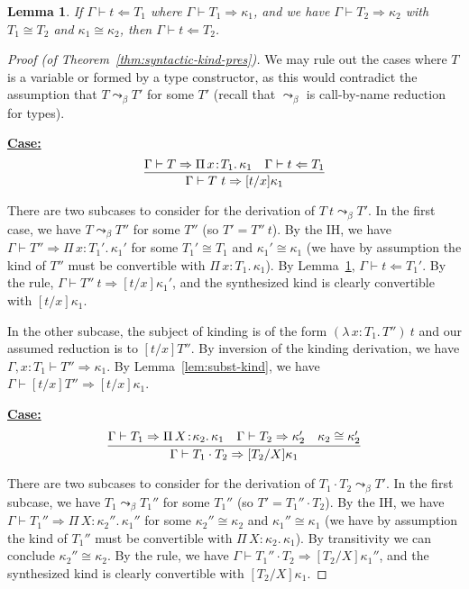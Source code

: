 \documentclass{article}
\newcommand{\abs}[4]{{#1}\, #2\! : \! #3.\, #4}
\newcommand{\tpcheck}[0]{\Leftarrow}
\newcommand{\tpsynth}[0]{\Rightarrow}
\newcommand{\startcase}[1]{\vspace{#1} \noindent\textbf{\underline{Case:}}}
\newtheorem{lemma}[theorem]{Lemma}
\begin{document}
\begin{lemma}
  \label{lem:tpcheck-conv}
  If \(\Gamma \vdash t \tpcheck T_1\) where \(\Gamma \vdash T_1 \tpsynth
  \kappa_1\), and we have \(\Gamma \vdash T_2 \tpsynth \kappa_2\) with \(T_1
  \cong T_2\) and \(\kappa_1 \cong \kappa_2\), then \(\Gamma \vdash t \tpcheck T_2\).
\end{lemma}

\begin{proof}[Proof (of Theorem~\ref{thm:syntactic-kind-pres})]
  We may rule out the cases where \(T\) is a variable or formed by a type
  constructor, as this would contradict the assumption that \(T \leadsto_{\beta}
  T'\) for some \(T'\) (recall that \(\leadsto_\beta\) is call-by-name reduction
  for types).

  \startcase{.2cm}
  \[
    \infer{\Gamma\vdash T\ t \tpsynth [t/x]\kappa_1}{\Gamma\vdash T \tpsynth
      \abs{\Pi}{x}{T_1}{\kappa_1} & \Gamma\vdash t \tpcheck T_1}
  \]

  There are two subcases to consider for the derivation of \(T\ t \leadsto_\beta
  T'\). In the first case, we have \(T \leadsto_\beta T''\) for some \(T''\) (so
  \(T' = T''\ t\)). By the IH, we have \(\Gamma \vdash T'' \tpsynth
  \abs{\Pi}{x}{T_1'}{\kappa_1'}\) for some \(T_1' \cong T_1\) and \(\kappa_1'
  \cong \kappa_1\) (we have by assumption the kind of \(T''\) must be
  convertible with \(\abs{\Pi}{x}{T_1}{\kappa_1}\)). By
  Lemma~\ref{lem:tpcheck-conv}, \(\Gamma \vdash t \tpcheck T_1'\). By the rule,
  \(\Gamma \vdash T''\ t \tpsynth [t/x]\kappa_1'\), and the synthesized kind is
  clearly convertible with \([t/x]\kappa_1\).

  In the other subcase, the subject of kinding is of the form
  \((\abs{\lambda}{x}{T_1}{T''})\ t\) and our assumed reduction is to
  \([t/x]T''\). By inversion of the kinding derivation, we have \(\Gamma,x:T_1
  \vdash T'' \tpsynth \kappa_1\). By Lemma~\ref{lem:subst-kind}, we have
  \(\Gamma \vdash [t/x]T'' \tpsynth [t/x]\kappa_1\).

  \startcase{.2cm}
  \[
    \infer{\Gamma\vdash T_1 \cdot T_2 \tpsynth [T_2/X]\kappa_1}{\Gamma\vdash T_1
      \tpsynth \abs{\Pi}{X}{\kappa_2}{\kappa_1} & \Gamma\vdash T_2 \tpsynth
      \kappa_2' & \kappa_2 \cong \kappa_2'}
  \]

  There are two subcases to consider for the derivation of \(T_1 \cdot T_2
  \leadsto_\beta T'\). In the first subcase, we have \(T_1 \leadsto_\beta
  T_1''\) for some \(T_1''\) (so \(T' = T_1'' \cdot T_2\)). By the IH, we have
  \(\Gamma \vdash T_1'' \tpsynth \abs{\Pi}{X}{\kappa_2''}{\kappa_1''}\) for some
  \(\kappa_2'' \cong \kappa_2\) and \(\kappa_1'' \cong \kappa_1\) (we have by
  assumption the kind of \(T_1''\) must be convertible with
  \(\abs{\Pi}{X}{\kappa_2}{\kappa_1}\)). By transitivity we can conclude
  \(\kappa_2'' \cong \kappa_2\). By the rule, we have \(\Gamma \vdash T_1''
  \cdot T_2 \tpsynth [T_2/X]\kappa_1''\), and the synthesized kind is clearly
  convertible with \([T_2/X]\kappa_1\).


\end{proof}
\end{document}
